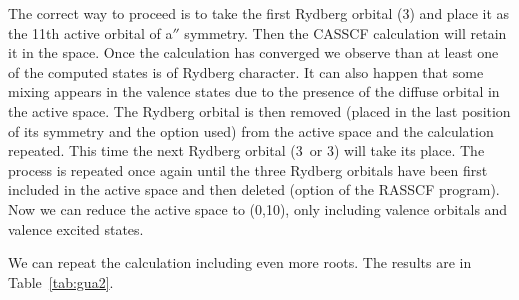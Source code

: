 The correct way to proceed is to take the first Rydberg orbital (3\pz) 
and place it as the 11th active orbital of a$''$ symmetry. Then
the CASSCF calculation will retain it in the space. Once the calculation
has converged we observe than at least one of the computed states is of
Rydberg character. It can also happen that some mixing appears in the
valence states due to the presence of the diffuse orbital in the active space.
The Rydberg orbital is then removed (placed in the last
position of its symmetry and the  option used) 
from the active space and the calculation
repeated. This time the next Rydberg orbital (3\dxz\ or 3\dyz) will take
its place. The process is repeated once again until the three Rydberg
orbitals have been first included in the active space and then
deleted (option  of the RASSCF program). Now
we can reduce the active space to (0,10), only including valence orbitals
and valence excited states.

We can repeat the calculation including even more roots. The results
are in Table~\ref{tab:gua2}.
 
